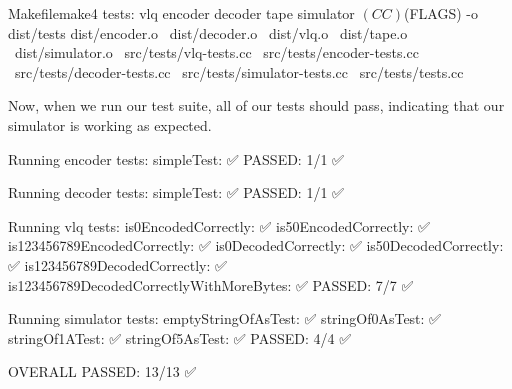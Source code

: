 \begin{file}{Makefile}{make}{4}
tests: vlq encoder decoder tape simulator
	$(CC) $(FLAGS) -o dist/tests dist/encoder.o \
	                             dist/decoder.o \
	                             dist/vlq.o \
	                             dist/tape.o \
	                             dist/simulator.o \
	                             src/tests/vlq-tests.cc \
	                             src/tests/encoder-tests.cc \
	                             src/tests/decoder-tests.cc \
	                             src/tests/simulator-tests.cc \
	                             src/tests/tests.cc
\end{file}

Now, when we run our test suite, all of our tests should pass, indicating that our simulator is working as expected.
\begin{stdout}
Running encoder tests:
  simpleTest: ✅
PASSED: 1/1 ✅

Running decoder tests:
  simpleTest: ✅
PASSED: 1/1 ✅

Running vlq tests:
  is0EncodedCorrectly: ✅
  is50EncodedCorrectly: ✅
  is123456789EncodedCorrectly: ✅
  is0DecodedCorrectly: ✅
  is50DecodedCorrectly: ✅
  is123456789DecodedCorrectly: ✅
  is123456789DecodedCorrectlyWithMoreBytes: ✅
PASSED: 7/7 ✅

Running simulator tests:
  emptyStringOfAsTest: ✅
  stringOf0AsTest: ✅
  stringOf1ATest: ✅
  stringOf5AsTest: ✅
PASSED: 4/4 ✅

OVERALL PASSED: 13/13 ✅
\end{stdout}
